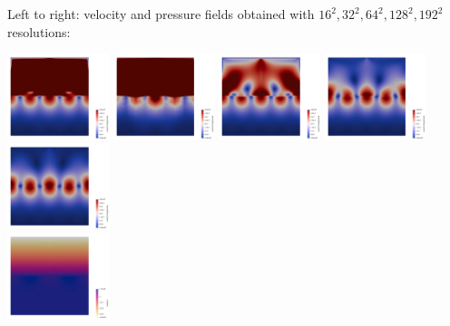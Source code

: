 Left to right: velocity and pressure fields obtained with $16^2, 32^2, 64^2, 128^2, 192^2$ resolutions:
\begin{center}
\includegraphics[width=2.96cm]{python_codes/fieldstone_120/paperresults/rt/structured/reduced/vel_p2p0.0001.png}
\includegraphics[width=2.96cm]{python_codes/fieldstone_120/paperresults/rt/structured/reduced/vel_p2p0.0000.png}
\includegraphics[width=2.96cm]{python_codes/fieldstone_120/paperresults/rt/structured/reduced/vel_p2p0.0002.png}
\includegraphics[width=2.96cm]{python_codes/fieldstone_120/paperresults/rt/structured/reduced/vel_p2p0.0003.png}
\includegraphics[width=2.96cm]{python_codes/fieldstone_120/paperresults/rt/structured/reduced/vel_p2p0.0004.png}\\
\includegraphics[width=2.96cm]{python_codes/fieldstone_120/paperresults/rt/structured/reduced/press_p2p0.0001.png}

\end{center}
